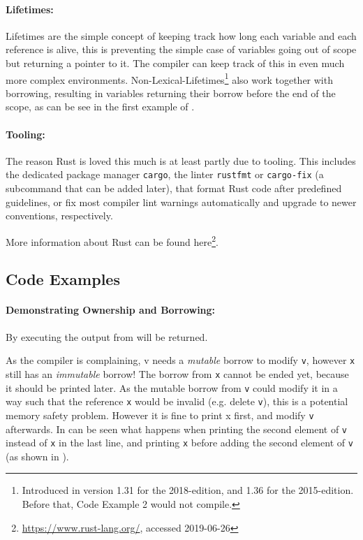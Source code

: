 \paragraph{Lifetimes:}\label{sec:lifetimes}
Lifetimes are the simple concept of keeping track how long each variable and
each reference is alive, this is preventing the simple case of variables
going out of scope but returning a pointer to it. The compiler can keep track
of this in even much more complex environments.
Non-Lexical-Lifetimes\footnote{Introduced in version 1.31 for the 2018-edition,
and 1.36 for the 2015-edition. Before that, Code Example 2 would not compile.}
also work together with borrowing, resulting in variables returning their
borrow before the end of the scope, as can be see in the first example of
.

\paragraph{Tooling:}\label{sec:tools}

The reason Rust is loved \cite{rustloved} this much is at least partly due to
tooling. This includes the dedicated package manager \verb|cargo|, the linter
\verb|rustfmt| or \verb|cargo-fix| (a subcommand that can be added later), that
format Rust code after predefined guidelines, or fix most compiler lint warnings
automatically and upgrade to newer conventions, respectively.

More information about Rust can be found
here\footnote{\url{https://www.rust-lang.org/}, accessed 2019-06-26}.




\subsection{Code Examples}\label{sec:examples}

\paragraph{Demonstrating Ownership and Borrowing:}

By executing  the output from  will be returned.



As the compiler is complaining, v needs a {\em mutable} borrow to modify
\verb|v|, however \verb|x| still has an {\em immutable} borrow! The borrow from
\verb|x| cannot be ended yet, because it should be printed later. As the mutable
borrow from \verb|v| could modify it in a way such that the reference \verb|x|
would be invalid (e.g. delete \verb|v|), this is a potential memory safety problem.
However it is fine to print x first, and modify \verb|v| afterwards. In
 can be seen what happens when printing the second element of
\verb|v| instead of \verb|x| in the last line, and printing \verb|x| before
adding the second element of \verb|v| (as shown in ).

